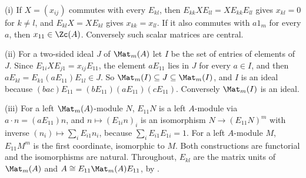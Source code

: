 (i) If $X = (x_{ij})$ commutes with every $E_{kl}$, then $E_{kk} X E_{ll} = X E_{kk} E_{ll}$ gives $x_{kl} = 0$ for $k \ne l$, and $E_{kl} X = X E_{kl}$ gives $x_{kk} = x_{ll}$. If it also commutes with $a 1_m$ for every $a$, then $x_{11} \in \Zc(A)$. Conversely such scalar matrices are central.

(ii) For a two-sided ideal $J$ of $\Mat_m(A)$ let $I$ be the set of entries of elements of $J$. Since $E_{1i} X E_{j1} = x_{ij} E_{11}$, the element $a E_{11}$ lies in $J$ for every $a \in I$, and then $a E_{kl} = E_{k1}(a E_{11})E_{1l} \in J$. So $\Mat_m(I) \subseteq J \subseteq \Mat_m(I)$, and $I$ is an ideal because $(b a c) E_{11} = (b E_{11})(a E_{11})(c E_{11})$. Conversely $\Mat_m(I)$ is an ideal.

(iii) For a left $\Mat_m(A)$-module $N$, $E_{11} N$ is a left $A$-module via $a \cdot n = (a E_{11}) n$, and $n \mapsto (E_{1i} n)_i$ is an isomorphism $N \to (E_{11}N)^{m}$ with inverse $(n_i) \mapsto \sum_i E_{i1} n_i$, because $\sum_i E_{i1}E_{1i} = 1$. For a left $A$-module $M$, $E_{11} M^{m}$ is the first coordinate, isomorphic to $M$. Both constructions are functorial and the isomorphisms are natural. Throughout, $E_{kl}$ are the matrix units of $\Mat_m(A)$ and $A \cong E_{11}\Mat_m(A)E_{11}$, by .
